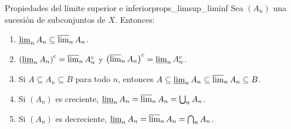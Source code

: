 \documentclass[11pt, a4paper]{article}
\begin{document}
\begin{proposicion}{Propiedades del límite superior e inferior}{props_limsup_liminf}
Sea $(A_n)$ una sucesión de subconjuntos de $X$. Entonces:
\begin{enumerate}
    \item $\varliminf_n A_n \subseteq \varlimsup_n A_n$.
    \item $\left(\varliminf_n A_n\right)^c = \varlimsup_n A_n^c$ y
    $\left(\varlimsup_n A_n\right)^c = \varliminf_n A_n^c$.
    \item Si $A \subseteq A_n \subseteq B$ para todo $n$, entonces
    $A \subseteq \varliminf_n A_n \subseteq \varlimsup_n A_n \subseteq B$.
    \item Si $(A_n)$ es creciente, $\varliminf_n A_n = \varlimsup_n A_n = \bigcup_n A_n$.
    \item Si $(A_n)$ es decreciente, $\varliminf_n A_n = \varlimsup_n A_n = \bigcap_n A_n$.
\end{enumerate}
\end{proposicion}
\end{document}
